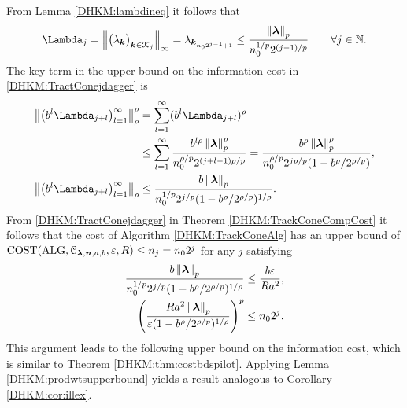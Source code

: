 \documentclass[USenglish]{article}
\theoremstyle{dgthm}
\theoremstyle{dgthm}
\theoremstyle{dgthm}
\theoremstyle{dgthm}
\theoremstyle{dgdef}
\theoremstyle{definition}
\DeclareMathOperator{\DHKMALG}{ALG}
\DeclareMathOperator{\DHKMCOST}{COST}
\newcommand{\DHKMnorm}[2][{}]{\ensuremath{\left \lVert #2 \right \rVert}_{#1}}
\begin{document}
From Lemma \ref{DHKM:lambdineq} it follows that 
\begin{equation*}
    \Lambda_j = \DHKMnorm[\infty]{\bigl(\lambda_{\bsk} \bigr)_{\bsk \in \calK_j}} = \lambda_{\bsk_{n_02^{j-1}+1}}\le \frac{\DHKMnorm[p]{\bslambda}}{n_0^{1/p} 2^{(j-1)/p}} \qquad \forall j \in \bbN.
\end{equation*}
The key term in the upper bound on the information cost in \eqref{DHKM:TractConejdagger} is
\begin{align*}
\DHKMnorm[\rho]{ \bigl(b^{l}\Lambda_{j+l} \bigr)_{l=1}^\infty}^\rho
 & =  \sum_{l=1}^\infty
( b^{l}\Lambda_{j+l})^\rho \\
& \le \sum_{l=1}^\infty  
 \frac{b^{l\rho} \DHKMnorm[p]{\bslambda}^\rho }{ n_0^{\rho/p} 2^{(j+l-1)\rho/p}} 
=  
 \frac{b^{\rho} \DHKMnorm[p]{\bslambda}^\rho }{ n_0^{\rho/p} 2^{j\rho/p} (1 - b^{\rho}/2^{\rho/p})}, \\
\DHKMnorm[\rho]{ \bigl(b^{l}\Lambda_{j+l} \bigr)_{l=1}^\infty}
 & \le  
 \frac{b \DHKMnorm[p]{\bslambda} }{ n_0^{1/p} 2^{j/p} (1 - b^{\rho}/2^{\rho/p})^{1/\rho}}.
\end{align*}
From \eqref{DHKM:TractConejdagger} in Theorem \ref{DHKM:TrackConeCompCost} it follows that the cost of Algorithm \ref{DHKM:TrackConeAlg} has an upper bound of $\DHKMCOST(\DHKMALG,\calC_{\bslambda,\bsn,a,b},\varepsilon,R) \le n_j = n_0 2^j$ for any $j$ satisfying 
\begin{align*}
    \frac{b \DHKMnorm[p]{\bslambda} }{ n_0^{1/p} 2^{j/p} (1 - b^{\rho}/2^{\rho/p})^{1/\rho}} &\le \frac{b\varepsilon}{R a^2}, \\
   \left(\frac{ R a^{2} \DHKMnorm[p]{\bslambda} }{\varepsilon (1 - b^{\rho}/2^{\rho/p})^{1/\rho}} \right)^p & \le n_0 2^{j}.
\end{align*}
This argument leads to the following upper bound on the information cost, which is similar to Theorem \ref{DHKM:thm:costbdspilot}.  Applying Lemma \ref{DHKM:prodwtsupperbound} yields a result analogous to Corollary \ref{DHKM:cor:illex}.
\end{document}
